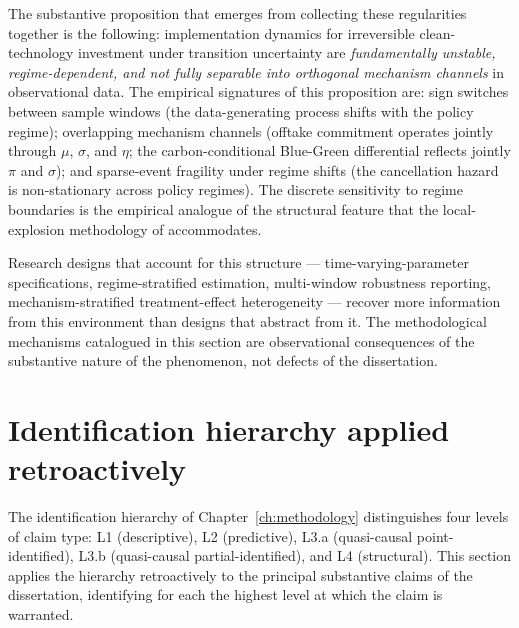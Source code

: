 The substantive proposition that emerges from collecting these regularities together is the following: implementation dynamics for irreversible clean-technology investment under transition uncertainty are \emph{fundamentally unstable, regime-dependent, and not fully separable into orthogonal mechanism channels} in observational data. The empirical signatures of this proposition are: sign switches between sample windows (the data-generating process shifts with the policy regime); overlapping mechanism channels (offtake commitment operates jointly through $\mu$, $\sigma$, and $\eta$; the carbon-conditional Blue-Green differential reflects jointly $\pi$ and $\sigma$); and sparse-event fragility under regime shifts (the cancellation hazard is non-stationary across policy regimes). The discrete sensitivity to regime boundaries is the empirical analogue of the structural feature that the local-explosion methodology of \cite{blasques2022local} accommodates.

Research designs that account for this structure --- time-varying-parameter specifications, regime-stratified estimation, multi-window robustness reporting, mechanism-stratified treatment-effect heterogeneity --- recover more information from this environment than designs that abstract from it. The methodological mechanisms catalogued in this section are observational consequences of the substantive nature of the phenomenon, not defects of the dissertation.

\section{Identification hierarchy applied retroactively}
\label{sec:ch10-identification-retrospective}

The identification hierarchy of Chapter~\ref{ch:methodology} distinguishes four levels of claim type: L1 (descriptive), L2 (predictive), L3.a (quasi-causal point-identified), L3.b (quasi-causal partial-identified), and L4 (structural). This section applies the hierarchy retroactively to the principal substantive claims of the dissertation, identifying for each the highest level at which the claim is warranted.

